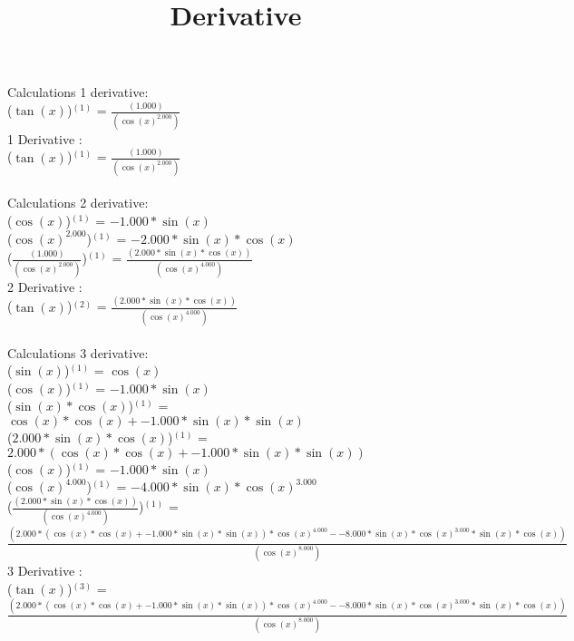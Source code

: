 \documentclass[a4paper, 12pt]{article}
\title{Derivative}
\begin{document}
\maketitle 
Calculations 1 derivative:\\ 
($\tan{(x)}$)$^{(1)}$ = $\frac{({1.000})}{(\cos{(x)}^{2.000})}$\\ 
1 Derivative : \\ 
($\tan{(x)}$)$^{(1)}$ = $\frac{({1.000})}{(\cos{(x)}^{2.000})}$\\ 
\\Calculations 2 derivative:\\ 
($\cos{(x)}$)$^{(1)}$ = ${-1.000}*\sin{(x)}$\\ 
($\cos{(x)}^{2.000}$)$^{(1)}$ = ${-2.000}*\sin{(x)}*\cos{(x)}$\\ 
($\frac{({1.000})}{(\cos{(x)}^{2.000})}$)$^{(1)}$ = $\frac{({2.000}*\sin{(x)}*\cos{(x)})}{(\cos{(x)}^{4.000})}$\\ 
2 Derivative : \\ 
($\tan{(x)}$)$^{(2)}$ = $\frac{({2.000}*\sin{(x)}*\cos{(x)})}{(\cos{(x)}^{4.000})}$\\ 
\\Calculations 3 derivative:\\ 
($\sin{(x)}$)$^{(1)}$ = $\cos{(x)}$\\ 
($\cos{(x)}$)$^{(1)}$ = ${-1.000}*\sin{(x)}$\\ 
($\sin{(x)}*\cos{(x)}$)$^{(1)}$ = $\cos{(x)}*\cos{(x)}+{-1.000}*\sin{(x)}*\sin{(x)}$\\ 
(${2.000}*\sin{(x)}*\cos{(x)}$)$^{(1)}$ = ${2.000}*{(\cos{(x)}*\cos{(x)}+{-1.000}*\sin{(x)}*\sin{(x)})}$\\ 
($\cos{(x)}$)$^{(1)}$ = ${-1.000}*\sin{(x)}$\\ 
($\cos{(x)}^{4.000}$)$^{(1)}$ = ${-4.000}*\sin{(x)}*\cos{(x)}^{3.000}$\\ 
($\frac{({2.000}*\sin{(x)}*\cos{(x)})}{(\cos{(x)}^{4.000})}$)$^{(1)}$ = $\frac{({2.000}*{(\cos{(x)}*\cos{(x)}+{-1.000}*\sin{(x)}*\sin{(x)})}*\cos{(x)}^{4.000}-{-8.000}*\sin{(x)}*\cos{(x)}^{3.000}*\sin{(x)}*\cos{(x)})}{(\cos{(x)}^{8.000})}$\\ 
3 Derivative : \\ 
($\tan{(x)}$)$^{(3)}$ = $\frac{({2.000}*{(\cos{(x)}*\cos{(x)}+{-1.000}*\sin{(x)}*\sin{(x)})}*\cos{(x)}^{4.000}-{-8.000}*\sin{(x)}*\cos{(x)}^{3.000}*\sin{(x)}*\cos{(x)})}{(\cos{(x)}^{8.000})}$\\ 
\\
\end{document}
